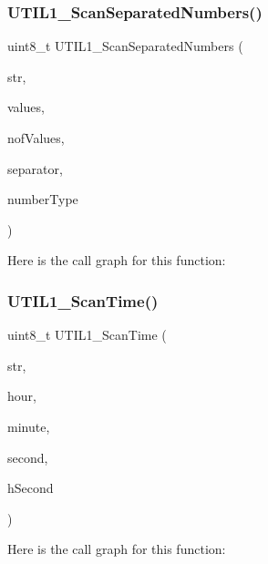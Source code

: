 \subsubsection{\texorpdfstring{U\+T\+I\+L1\+\_\+\+Scan\+Separated\+Numbers()}{UTIL1\_ScanSeparatedNumbers()}}
{\footnotesize\ttfamily uint8\+\_\+t U\+T\+I\+L1\+\_\+\+Scan\+Separated\+Numbers (\begin{DoxyParamCaption}\item[{const unsigned char $\ast$$\ast$}]{str,  }\item[{uint8\+\_\+t $\ast$}]{values,  }\item[{uint8\+\_\+t}]{nof\+Values,  }\item[{char}]{separator,  }\item[{\hyperlink{group___u_t_i_l1__module_gac119fea18ee711120d44fe056b99b364}{U\+T\+I\+L1\+\_\+\+Separated\+Number\+Type}}]{number\+Type }\end{DoxyParamCaption})}

Here is the call graph for this function\+:
\mbox{\label{group___u_t_i_l1__module_ga9ec1d18020c522a1f0060a04e8731768}} 
\subsubsection{\texorpdfstring{U\+T\+I\+L1\+\_\+\+Scan\+Time()}{UTIL1\_ScanTime()}}
{\footnotesize\ttfamily uint8\+\_\+t U\+T\+I\+L1\+\_\+\+Scan\+Time (\begin{DoxyParamCaption}\item[{const unsigned char $\ast$$\ast$}]{str,  }\item[{uint8\+\_\+t $\ast$}]{hour,  }\item[{uint8\+\_\+t $\ast$}]{minute,  }\item[{uint8\+\_\+t $\ast$}]{second,  }\item[{uint8\+\_\+t $\ast$}]{h\+Second }\end{DoxyParamCaption})}

Here is the call graph for this function\+:
\mbox{\label{group___u_t_i_l1__module_gade9930ffbf6cbfd4b056407f2a4a2622}} 
